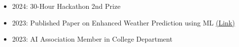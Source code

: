\documentclass[10pt,a4paper,ragged2e,withhyper]{altacv}
\begin{document}
\begin{paracol}{2}
\divider


\divider


\begin{itemize}
    \item 2024: 30-Hour Hackathon 2nd Prize
    \item 2023: Published Paper on Enhanced Weather Prediction using ML \href{https://github.com/silentFellow/weatherPrediction.git}{(Link)}
    \item 2023: AI Association Member in College Department
\end{itemize}


\end{paracol}
\end{document}
